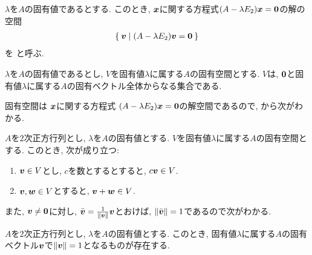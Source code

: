 \begin{definition}
  $\lambda$を$A$の固有値であるとする.
  このとき,
  $\boldsymbol{x}$に関する方程式$(A-\lambda E_2)\boldsymbol{x}=\boldsymbol{0}$の解の空間
  \begin{align*}
    \Set{\boldsymbol{v}| (A-\lambda E_2)\boldsymbol{v}=\boldsymbol{0}}
  \end{align*}
  を
 と呼ぶ.
\end{definition}
\begin{remark}
  $\lambda$を$A$の固有値であるとし,
  $V$を固有値$\lambda$に属する$A$の固有空間とする.
  $V$は,
  $\boldsymbol{0}$と固有値$\lambda$に属する$A$の固有ベクトル全体からなる集合である.
\end{remark}
固有空間は
$\boldsymbol{x}$に関する方程式
$(A-\lambda E_2)\boldsymbol{x}=\boldsymbol{0}$の解空間であるので,
から次がわかる.
\begin{prop}
  $A$を$2$次正方行列とし,
  $\lambda$を$A$の固有値とする.
  $V$を固有値$\lambda$に属する$A$の固有空間とする.
  このとき, 次が成り立つ:
  \begin{enumerate}
  \item $\boldsymbol{v}\in V$とし, $c$を数とするとすると, $c\boldsymbol{v}\in V$.
  \item $\boldsymbol{v},\boldsymbol{w}\in V$とすると, $\boldsymbol{v}+\boldsymbol{w}\in V$.
  \end{enumerate}
\end{prop}
また, $\boldsymbol{v}\neq\boldsymbol{0}$に対し, $\bar{\boldsymbol{v}}=\frac{1}{\|\boldsymbol{v}\|}\boldsymbol{v}$とおけば,
$\|\bar{\boldsymbol{v}}\|=1$であるので次がわかる.
\begin{cor}
  $A$を$2$次正方行列とし,
  $\lambda$を$A$の固有値とする.
  このとき, 
  固有値$\lambda$に属する$A$の固有ベクトル$\boldsymbol{v}$で$\|\boldsymbol{v}\|=1$となるものが存在する.
\end{cor}

